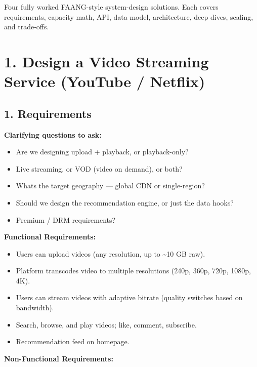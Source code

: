 \documentclass[11pt]{article}
\providecommand{\tightlist}{\setlength{\itemsep}{1pt}\setlength{\parskip}{0pt}}
\begin{document}
\makecoverpage

\thispagestyle{empty}
{\hypersetup{hidelinks}\tableofcontents}
\clearpage

Four fully worked FAANG-style system-design solutions. Each covers requirements,
capacity math, API, data model, architecture, deep dives, scaling, and trade-offs.

\section{1. Design a Video Streaming Service (YouTube / Netflix)}\label{1-design-a-video-streaming-service-youtube--netflix}

\subsection{1. Requirements}\label{1-requirements}

\textbf{Clarifying questions to ask:}

\begin{itemize}
\tightlist
\item
  Are we designing upload + playback, or playback-only?
\item
  Live streaming, or VOD (video on demand), or both?
\item
  What\textquotesingle s the target geography --- global CDN or single-region?
\item
  Should we design the recommendation engine, or just the data hooks?
\item
  Premium / DRM requirements?
\end{itemize}

\textbf{Functional Requirements:}

\begin{itemize}
\tightlist
\item
  Users can upload videos (any resolution, up to \textasciitilde10 GB raw).
\item
  Platform transcodes video to multiple resolutions (240p, 360p, 720p, 1080p, 4K).
\item
  Users can stream videos with adaptive bitrate (quality switches based on bandwidth).
\item
  Search, browse, and play videos; like, comment, subscribe.
\item
  Recommendation feed on homepage.
\end{itemize}

\textbf{Non-Functional Requirements:}
\end{document}
